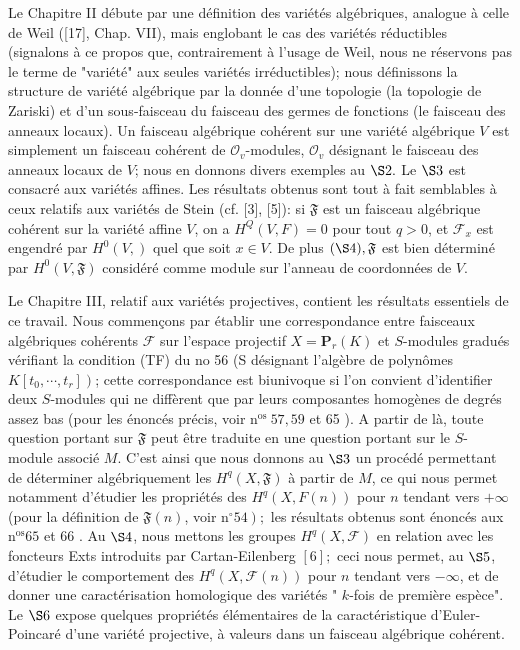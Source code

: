 Le Chapitre II débute par une définition des variétés algébriques, analogue à celle de Weil ([17], Chap. VII), mais englobant le cas des variétés réductibles (signalons à ce propos que, contrairement à l'usage de Weil, nous ne réservons pas le terme de "variété" aux seules variétés irréductibles); nous définissons la structure de variété algébrique par la donnée d'une topologie (la topologie de Zariski) et d'un sous-faisceau du faisceau des germes de fonctions (le faisceau des anneaux locaux). Un faisceau algébrique cohérent sur une variété algébrique $V$ est simplement un faisceau cohérent de $\mathcal{O}_{v}$-modules, $\mathcal{O}_{v}$ désignant le faisceau des anneaux locaux de $V$; nous en donnons divers exemples au $\S 2 .$ Le $\S 3$ est consacré aux variétés affines. Les résultats obtenus sont tout à fait semblables à ceux relatifs aux variétés de Stein (cf. [3], [5]): si $\mathfrak{F}$ est un faisceau algébrique cohérent sur la variété affine $V$, on a $H^{Q}(V, F)=0$ pour tout $q>0$, et $\mathcal{F}_{x}$ est engendré par $H^{0}(V, \mathfrak{})$ quel que soit $x \in V$. De plus $(\S 4), \mathfrak{F}$ est bien déterminé par $H^{0}(V, \mathfrak{F})$ considéré comme module sur l'anneau de coordonnées de $V$.

Le Chapitre III, relatif aux variétés projectives, contient les résultats essentiels de ce travail. Nous commençons par établir une correspondance entre faisceaux algébriques cohérents $\mathcal{F}$ sur l'espace projectif $X=\mathbf{P}_{r}(K)$ et $S$-modules gradués vérifiant la condition (TF) du no 56 (S désignant l'algèbre de polynômes $\left.K\left[t_{0}, \cdots, t_{r}\right]\right)$; cette correspondance est biunivoque si l'on convient d'identifier deux $S$-modules qui ne diffèrent que par leurs composantes homogènes de degrés assez bas (pour les énoncés précis, voir $\mathrm{n}^{\text {os }} 57,59$ et 65 ). A partir de là, toute question portant sur $\mathfrak{F}$ peut être traduite en une question portant sur le $S$-module associé $M$. C'est ainsi que nous donnons au $\S 3$ un procédé permettant de déterminer algébriquement les $H^{q}(X, \mathfrak{F})$ à partir de $M$, ce qui nous permet notamment d'étudier les propriétés des $H^{q}(X, F(n))$ pour $n$ tendant vers $+\infty$ (pour la définition de $\mathfrak{F}(n)$, voir $\left.\mathrm{n}^{\circ} 54\right) ;$ les résultats obtenus sont énoncés aux $\mathrm{n}^{\mathrm{os}} 65$ et 66 . Au $\S 4$, nous mettons les groupes $H^{q}(X, \mathcal{F})$ en relation avec les foncteurs Exts introduits par Cartan-Eilenberg $[6] ;$ ceci nous permet, au $\S 5$, d'étudier le comportement des $H^{q}(X, \mathcal{F}(n))$ pour $n$ tendant vers $-\infty$, et de donner une caractérisation homologique des variétés " $k$-fois de première espèce". Le $\S 6$ expose quelques propriétés élémentaires de la caractéristique d'Euler-Poincaré d'une variété projective, à valeurs dans un faisceau algébrique cohérent.

